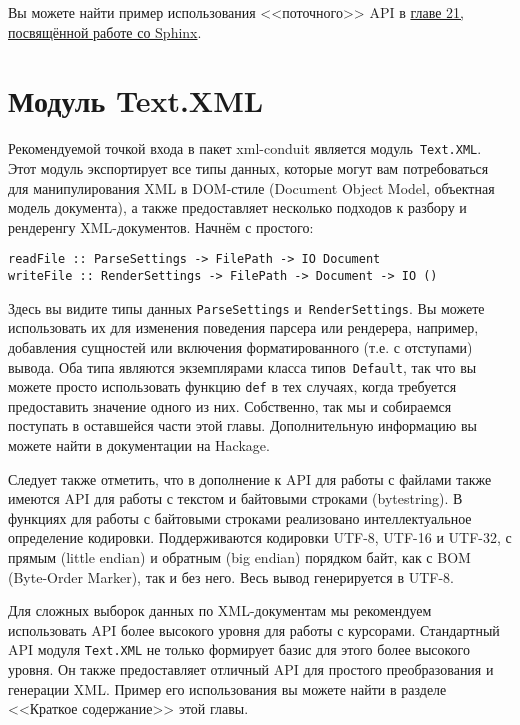 \begin{remark}
    Вы можете найти пример использования <<поточного>> API в
    \hyperref[chap:sphinx]{главе 21, посвящённой работе со Sphinx}.
\end{remark}

\section{Модуль Text.XML}
Рекомендуемой точкой входа в пакет xml-conduit является модуль~\lstinline!Text.XML!.
Этот модуль экспортирует все типы данных, которые могут вам потребоваться для
манипулирования XML в DOM-стиле (Document Object Model, объектная модель
документа), а также предоставляет несколько подходов к разбору и рендеренгу
XML-документов. Начнём с простого:
\begin{lstlisting}
readFile :: ParseSettings -> FilePath -> IO Document
writeFile :: RenderSettings -> FilePath -> Document -> IO ()
\end{lstlisting}

Здесь вы видите типы данных \lstinline!ParseSettings!
и~\lstinline!RenderSettings!. Вы можете использовать их для изменения поведения
парсера или рендерера, например, добавления сущностей или включения
форматированного (т.е. с отступами) вывода. Оба типа являются экземплярами
класса типов~\lstinline!Default!,
так что вы можете просто использовать функцию \lstinline!def! в тех случаях,
когда требуется предоставить значение одного из них. Собственно, так мы и
собираемся поступать в оставшейся части этой главы. Дополнительную информацию
вы можете найти в документации на Hackage.

Следует также отметить, что в дополнение к API для работы с файлами также
имеются API для работы с текстом и байтовыми строками (bytestring). В функциях
для работы с байтовыми строками реализовано интеллектуальное определение
кодировки. Поддерживаются кодировки UTF-8, UTF-16 и UTF-32, с прямым (little
endian) и обратным (big endian) порядком байт, как с BOM (Byte-Order Marker),
так и без него. Весь вывод генерируется в UTF-8.

Для сложных выборок данных по XML-документам мы рекомендуем использовать API
более высокого уровня для работы с курсорами. Стандартный API модуля
\lstinline!Text.XML! не только формирует базис для этого более высокого уровня.
Он также предоставляет отличный API для простого преобразования и генерации
XML. Пример его использования вы можете найти в разделе <<Краткое содержание>>
этой главы.

